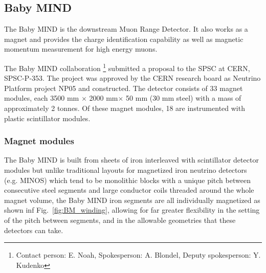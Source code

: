 \subsection{Baby MIND}
The Baby MIND is the downstream Muon Range Detector.
It also works as a magnet and provides the charge identification capability
as well as magnetic momentum measurement for high energy muons.

The Baby MIND collaboration \footnote{Contact person: E. Noah, Spokesperson: A. Blondel, Deputy spokesperson: Y. Kudenko} submitted a proposal to the SPSC at CERN, SPSC-P-353.
The project was approved by the CERN research board as Neutrino Platform project NP05 and constructed.
The detector consists of 33 magnet modules, each 3500 mm $\times$ 2000 mm$ \times$ 50 mm (30 mm steel) with a mass of approximately 2 tonnes. Of these magnet modules, 18 are instrumented with plastic scintillator modules. 




\subsubsection{Magnet modules}

The Baby MIND is built from sheets of iron interleaved with scintillator detector modules but unlike traditional layouts for magnetized iron neutrino detectors (e.g. MINOS) which tend to be monolithic blocks with a unique pitch between consecutive steel segments and large conductor coils threaded around the whole magnet volume, the Baby MIND iron segments are all individually magnetized as shown inf Fig.~\ref{fig:BM_winding}, allowing for far greater flexibility in the setting of the pitch between segments, and in the allowable geometries that these detectors can take. 

